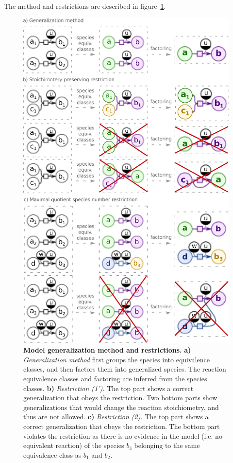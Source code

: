 \documentclass[9pt]{article}
\newcounter{fig}
\begin{document}
The method and restrictions are described in figure~\ref{fig:mg}.

\begin{figure}[th]
\centering
\includegraphics{../pics/Zhukova_Fig_1.eps}
\caption{\textbf{Model generalization method and restrictions.} 
\textbf{a)} \textit{Generalization method} first groups the species into equivalence classes, and then factors them into generalized species. The reaction equivalence classes and factoring are inferred from the species classes.
\textbf{b)} \textit{Restriction (1').} The top part shows a correct generalization that obeys the restriction. Two bottom parts show generalizations that would change the reaction stoichiometry, and thus are not allowed.
\textbf{c)} \textit{Restriction (2).} The top part shows a correct generalization that obeys the restriction. The bottom part violates the restriction as there is no evidence in the model (i.e. no equivalent reaction) of the species $b_3$ belonging to the same equivalence class as $b_1$ and $b_2$.}
\label{fig:mg}
\end{figure}
\end{document}
